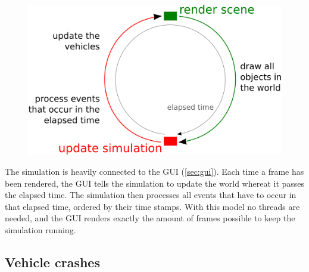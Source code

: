 \begin{figure}[H]
\begin{center}
\includegraphics[scale=0.5]{images/simulationprocess.png}
\end{center}
\end{figure}

\noindent The simulation is heavily connected to the GUI (\ref{sec:gui}). Each
time a frame has been rendered, the GUI tells the simulation to update the 
world whereat it passes the elapsed time. The simulation then processes all
events that have to occur in that elapsed time, ordered by their time stamps.
With this model no threads are needed, and the GUI renders exactly the amount
of frames possible to keep the simulation running.

\subsection{Vehicle crashes}

